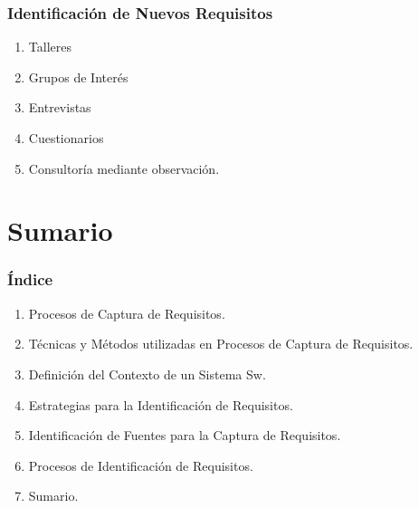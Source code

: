 ﻿\documentclass[handout,a4paper,slidestop,xcolor=pst,dvips,blue]{beamer}
\begin{document}
\begin{frame}[c]
     \frametitle{Identificación de Nuevos Requisitos}
     \begin{enumerate}[<+->]
        \item Talleres
        \item Grupos de Interés
        \item Entrevistas
        \item Cuestionarios
        \item Consultoría mediante observación.
     \end{enumerate}
\end{frame}

\section{Sumario}

\begin{frame}[c]
    \frametitle{Índice}
    \begin{enumerate}
         \item Procesos de Captura de Requisitos.
         \item Técnicas y Métodos utilizadas en Procesos de Captura de Requisitos.
         \item Definición del Contexto de un Sistema Sw.
         \item Estrategias para la Identificación de Requisitos.
         \item Identificación de Fuentes para la Captura de Requisitos.
         \item Procesos de Identificación de Requisitos.
         \item \alert{Sumario}.
    \end{enumerate}
\end{frame}
\end{document}
